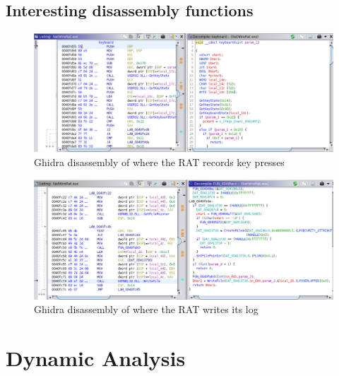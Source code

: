 \documentclass{article}
\begin{document}
    \subsection{Interesting disassembly functions}
    \begin{figure}[H]
        \includegraphics[width=\textwidth]{keyboard-function.png}
        \caption{Ghidra disassembly of where the RAT records key presses}
    \end{figure}
    \begin{figure}[H]
        \includegraphics[width=\textwidth]{ghidra-writeFile.png}
        \caption{Ghidra disassembly of where the RAT writes its log}
    \end{figure}
    \pagebreak
    \section{Dynamic Analysis}
\end{document}
